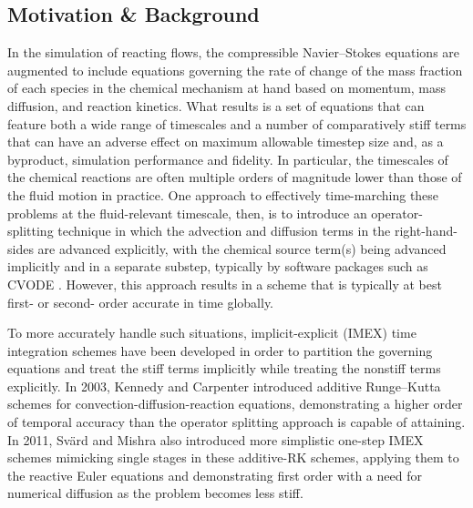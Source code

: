 \subsection{Motivation \& Background} \label{sec:timeint_bg}


In the simulation of reacting flows, the compressible Navier--Stokes
equations are augmented to include equations governing the rate of
change of the mass fraction of each species in the chemical mechanism
at hand based on momentum, mass diffusion, and reaction kinetics. What
results is a set of equations that can feature both a wide range of
timescales and a number of comparatively stiff terms that can have
an adverse effect on maximum allowable timestep size and, as a byproduct,
simulation performance and fidelity. In particular, the timescales
of the chemical reactions are often multiple orders of magnitude lower
than those of the fluid motion in practice. One approach to effectively
time-marching these problems at the fluid-relevant timescale, then, is
to introduce an operator-splitting technique \cite{sportisse2000method,
strang1968construction, lapointe2020data, macart2016semi,
ren2008second, knio1999semi} in which the advection
and diffusion terms in the right-hand-sides are advanced explicitly,
with the chemical source term(s) being advanced implicitly and
in a separate substep, typically by software packages such as CVODE \cite{cohen1996cvode}.
However, this approach results in a scheme that is typically at best
first- or second- order accurate in time globally.

To more accurately handle such situations, implicit-explicit (IMEX) time
integration schemes have been developed in order to partition the
governing equations and treat the stiff terms implicitly while treating
the nonstiff terms explicitly. In 2003, Kennedy and Carpenter \cite{kennedy2003additive}
introduced additive Runge--Kutta schemes for convection-diffusion-reaction equations,
demonstrating a higher order of temporal accuracy than the operator splitting
approach is capable of attaining. In 2011, Sv{\"a}rd and Mishra \cite{svard2011implicit}
also introduced more simplistic one-step IMEX schemes mimicking single stages in these
additive-RK schemes, applying them to the reactive Euler equations and
demonstrating first order with a need for numerical diffusion as the problem
becomes less stiff.

